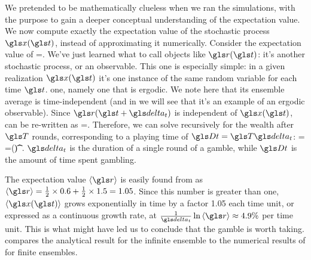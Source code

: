 We pretended to be mathematically clueless when we ran the simulations,
with the purpose to gain a deeper conceptual understanding of the expectation 
value. We now compute exactly the expectation value of the stochastic process $\x(\t)$, instead of 
approximating it numerically. Consider the expectation value of   
\be
\ave{\x(\t+\dt)}=\ave{\x(\t)\gr(\t+\dt)}.
\ee
We've just learned what to call objects like $\gr(\t)$: it's another stochastic process, or an observable. This one is  especially simple: in a given realization $\x(\t)$ it's one instance of the same random variable for each time $\t$.  one, namely one that is ergodic. We note here that its ensemble average is time-independent (and in  we will see that it's an example of an ergodic observable).
Since $\gr(\t+\dt)$ is independent of $\x(\t)$,  can be re-written as
\be
\ave{\x(\t+\dt)}=\ave{\x(\t)}\ave{\gr}.
\ee
Therefore, we can solve recursively for the wealth after $\T$ rounds, corresponding to a playing time of $\Dt=\T\dt$:
\be
\ave{\x(\t+\Dt)} = \ave{\x(\t+\T\dt)}=\x(\t)\ave{\gr}^\T.
\ee
$\dt$ is the duration of a single round of a gamble, while $\Dt$ is the amount of time spent gambling.

The expectation value $\ave{\gr}$ is easily found from  
as $\ave{\gr}=\frac{1}{2}\times 0.6 + \frac{1}{2}\times 1.5=1.05$. Since 
this number is greater than one, $\ave{\x(\t)}$ grows exponentially in 
time by a factor 1.05 each time unit, or expressed as a continuous 
growth rate, at $\frac{1}{\dt}\ln \ave{\gr}\approx4.9\%$ per time 
unit. This is what might have led us to
conclude that the gamble is worth taking.  compares the
analytical result for the infinite ensemble to the numerical results 
of  for finite ensembles.

